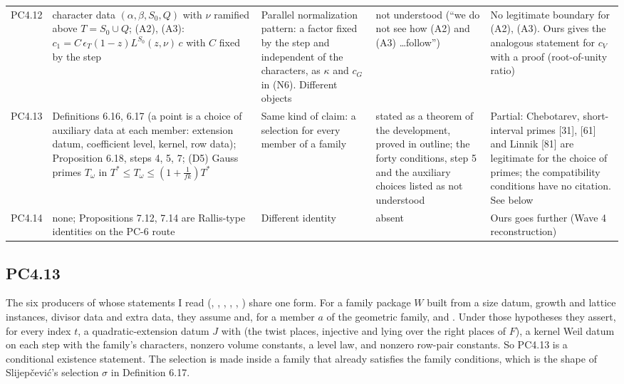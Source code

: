 \documentclass[11pt]{article}
\begin{document}
\begin{longtable}{>{\raggedright}p{}>{\raggedright}p{}>{\raggedright}p{}>{\raggedright}p{}>{\raggedright\arraybackslash}p{}}
PC4.12 & character data $(\alpha,\beta,S_0,Q)$ with $\nu$ ramified above $T=S_0\cup Q$; (A2), (A3): $c_1=C\,\epsilon_T(1-z)L^{S_0}(z,\nu)\,c$ with $C$ fixed by the step & Parallel normalization pattern: a factor fixed by the step and independent of the characters, as $\kappa$ and $c_G$ in (N6). Different objects & not understood (``we do not see how (A2) and (A3) \dots follow'') & No legitimate boundary for (A2), (A3). Ours gives the analogous statement for $c_V$ with a proof (root-of-unity ratio)\\
PC4.13 & Definitions 6.16, 6.17 (a point is a choice of auxiliary data at each member: extension datum, coefficient level, kernel, row data); Proposition 6.18, steps 4, 5, 7; (D5) Gauss primes $T_\omega$ in $T^*\le T_\omega\le(1+\frac1{fk})T^*$ & Same kind of claim: a selection for every member of a family & stated as a theorem of the development, proved in outline; the forty conditions, step 5 and the auxiliary choices listed as not understood & Partial: Chebotarev, short-interval primes [31], [61] and Linnik [81] are legitimate for the choice of primes; the compatibility conditions have no citation. See below\\
PC4.14 & none; Propositions 7.12, 7.14 are Rallis-type identities on the PC-6 route & Different identity & absent & Ours goes further (Wave 4 reconstruction)\\
\bottomrule
\end{longtable}

\subsection{PC4.13}

The six producers of  whose statements I read (, , , , , ) share one form. For a family package $W$ built from a size datum, growth and lattice instances, divisor data and extra data, they assume  and, for a member $a$ of the geometric family,  and . Under those hypotheses they assert, for every index $t$, a quadratic-extension datum $J$ with  (the twist places, injective and lying over the right places of $F$), a kernel Weil datum on each step with the family's characters, nonzero volume constants, a level law, and nonzero row-pair constants. So PC4.13 is a conditional existence statement. The selection is made inside a family that already satisfies the family conditions, which is the shape of Slijepčević's selection $\sigma$ in Definition 6.17.
\end{document}
